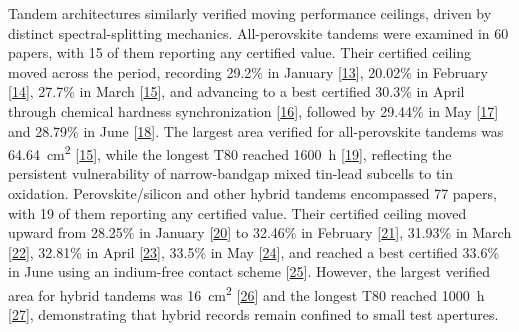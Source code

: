 \documentclass[
  11pt,
]{article}
\begin{document}
Tandem architectures similarly verified moving performance ceilings,
driven by distinct spectral-splitting mechanics. All-perovskite tandems
were examined in 60 papers, with 15 of them reporting any certified
value. Their certified ceiling moved across the period, recording 29.2\%
in January {[}\href{https://doi.org/10.1038/s41467-025-68213-2}{13}{]},
20.02\% in February {[}\href{https://doi.org/10.1002/aenm.70755}{14}{]},
27.7\% in March
{[}\href{https://doi.org/10.1038/s41467-026-70848-8}{15}{]}, and
advancing to a best certified 30.3\% in April through chemical hardness
synchronization
{[}\href{https://doi.org/10.1038/s41565-026-02165-6}{16}{]}, followed by
29.44\% in May
{[}\href{https://doi.org/10.1038/s41467-026-73210-0}{17}{]} and 28.79\%
in June {[}\href{https://doi.org/10.1002/anie.4918900}{18}{]}. The
largest area verified for all-perovskite tandems was
\qty{64.64}{\centi\meter\squared}
{[}\href{https://doi.org/10.1038/s41467-026-70848-8}{15}{]}, while the
longest T80 reached \qty{1600}{\hour}
{[}\href{https://doi.org/10.1002/pip.70077}{19}{]}, reflecting the
persistent vulnerability of narrow-bandgap mixed tin-lead subcells to
tin oxidation. Perovskite/silicon and other hybrid tandems encompassed
77 papers, with 19 of them reporting any certified value. Their
certified ceiling moved upward from 28.25\% in January
{[}\href{https://doi.org/10.1007/s40820-025-01962-3}{20}{]} to 32.46\%
in February
{[}\href{https://doi.org/10.1021/acsenergylett.5c04127}{21}{]}, 31.93\%
in March {[}\href{https://doi.org/10.1016/j.esci.2026.100563}{22}{]},
32.81\% in April {[}\href{https://doi.org/10.1002/adma.73106}{23}{]},
33.5\% in May
{[}\href{https://doi.org/10.1038/s41467-026-72794-x}{24}{]}, and reached
a best certified 33.6\% in June using an indium-free contact scheme
{[}\href{https://doi.org/10.1126/science.aef5355}{25}{]}. However, the
largest verified area for hybrid tandems was
\qty{16}{\centi\meter\squared}
{[}\href{https://doi.org/10.1016/j.solmat.2026.114223}{26}{]} and the
longest T80 reached \qty{1000}{\hour}
{[}\href{https://doi.org/10.1002/anie.5162616}{27}{]}, demonstrating
that hybrid records remain confined to small test apertures.
\end{document}

